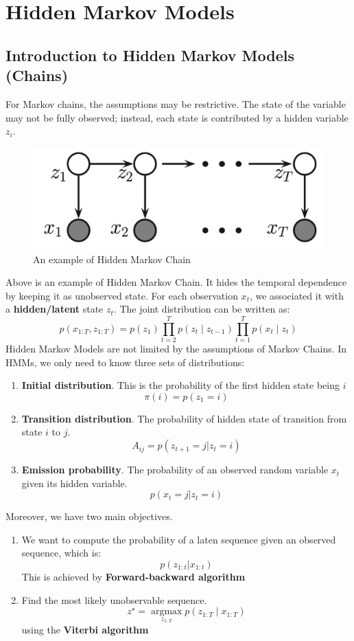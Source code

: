 \section{Hidden Markov Models}
\subsection{Introduction to Hidden Markov Models (Chains)}
For Markov chains, the assumptions may be restrictive. The state of the variable may not be fully observed; instead, each state is contributed by a hidden variable $z_i$.
\begin{figure}[H]
    \centering
    \includegraphics[width = .4\linewidth]{codes/figures/section7/figure_7_1.png}
    \caption{An example of Hidden Markov Chain}
    \label{fig:hidden_markov_chain}
\end{figure}
Above is an example of Hidden Markov Chain. It hides the temporal dependence by keeping it as unobserved state. For each observation $x_t$, we associated it with a \textbf{hidden/latent} state $z_t$. The joint distribution can be written as:
$$p\left(x_{1: T}, z_{1: T}\right)=p\left(z_1\right) \prod_{t=2}^T p\left(z_t \mid z_{t-1}\right) \prod_{t=1}^T p\left(x_t \mid z_t\right)$$
Hidden Markov Models are not limited by the assumptions of Markov Chains. In HMMs, we only need to know three sets of distributions:
\begin{enumerate}
    \item \textbf{Initial distribution}. This is the probability of the first hidden state being $i$
    $$\pi(i)=p(z_1=i)$$
    \item \textbf{Transition distribution}. The probability of hidden state of transition from state $i$ to $j$.
    $$A_{ij}=p(z_{t+1}=j|z_t=i)$$
    \item \textbf{Emission probability}. The probability of an observed random variable $x_t$ given its hidden variable.
    $$p(x_t=j|z_t=i)$$
\end{enumerate}
Moreover, we have two main objectives.
\begin{enumerate}
    \item We want to compute the probability of a laten sequence given an observed sequence, which is:
    $$p(z_{1:t}|x_{1:t})$$
    This is achieved by \textbf{Forward-backward algorithm}
    \item Find the most likely unobservable sequence.
    $$z^{\star}=\underset{z_{1: T}}{\operatorname{argmax}} p\left(z_{1: T} \mid x_{1: T}\right)$$
    using the \textbf{Viterbi algorithm}
\end{enumerate}

